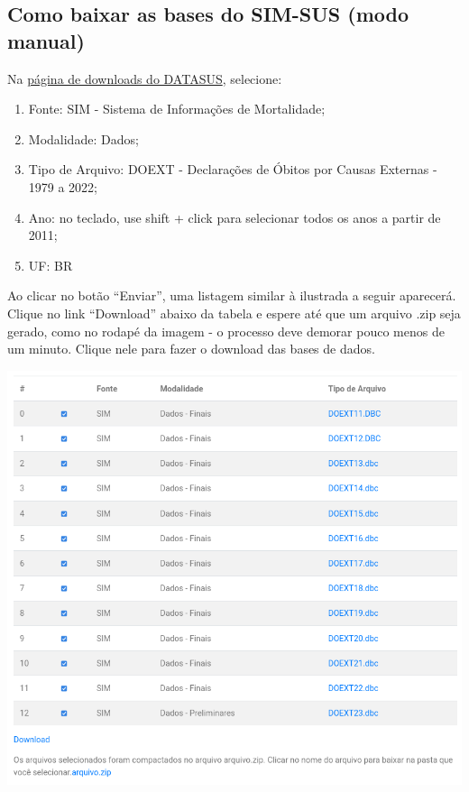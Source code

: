 \documentclass[
]{article}
\begin{document}
\subsection{Como baixar as bases do SIM-SUS (modo
manual)}\label{como-baixar-as-bases-do-sim-sus-modo-manual}

Na \href{https://datasus.saude.gov.br/transferencia-de-arquivos/}{página
de downloads do DATASUS}, selecione:

\begin{enumerate}
\def\labelenumi{\arabic{enumi}.}
\item
  Fonte: SIM - Sistema de Informações de Mortalidade;
\item
  Modalidade: Dados;
\item
  Tipo de Arquivo: DOEXT - Declarações de Óbitos por Causas Externas -
  1979 a 2022;
\item
  Ano: no teclado, use shift + click para selecionar todos os anos a
  partir de 2011;
\item
  UF: BR
\end{enumerate}

Ao clicar no botão ``Enviar'', uma listagem similar à ilustrada a seguir
aparecerá. Clique no link ``Download'' abaixo da tabela e espere até que
um arquivo .zip seja gerado, como no rodapé da imagem - o processo deve
demorar pouco menos de um minuto. Clique nele para fazer o download das
bases de dados.

\href{https://datasus.saude.gov.br/transferencia-de-arquivos/}{\includegraphics[width=11.17in]{../imgs/DATASUS} }
\end{document}
